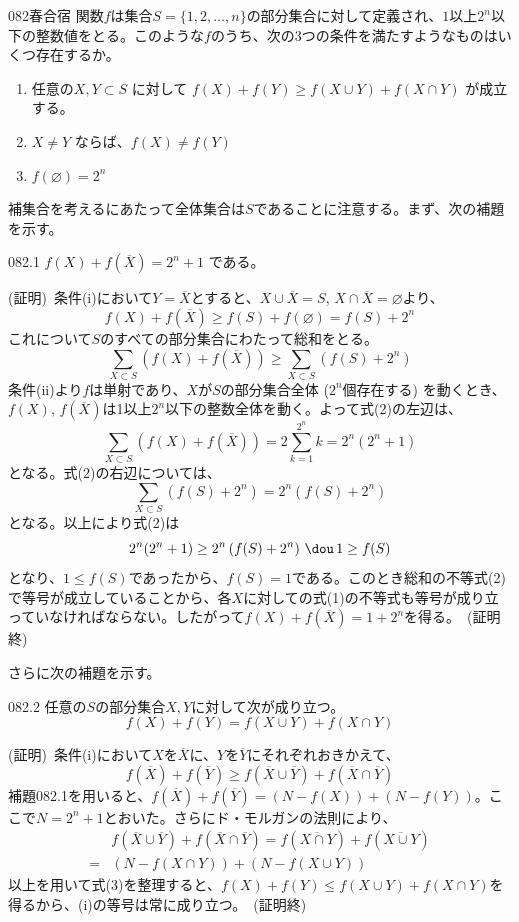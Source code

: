 \begin{prob}{082}{}{春合宿}
 関数$f$は集合$S=\{1, 2, \dots, n\}$の部分集合に対して定義され、$1$以上$2^n$以下の整数値をとる。このような$f$のうち、次の3つの条件を満たすようなものはいくつ存在するか。
 \begin{enumerate}
  \renewcommand{\labelenumi}{\arabic{enumi}.}
  \item 任意の$X, Y \subset S$ に対して $f(X)+f(Y) \ge f(X\cup Y)+f(X\cap Y)$ が成立する。
  \item $X \neq Y$ ならば、$f(X)\neq f(Y)$
  \item $f(\varnothing)=2^n$
 \end{enumerate}
\end{prob}

補集合を考えるにあたって全体集合は$S$であることに注意する。まず、次の補題を示す。
\begin{subthm}{082.1}
 $f(X)+f(\overline{X})=2^n+1$ である。
\end{subthm}

(証明)~条件(i)において$Y=\overline{X}$とすると、$X\cup\overline{X}=S$, $X\cap\overline{X}=\varnothing$より、
\[ f(X)+f(\overline{X})\ge f(S)+f(\varnothing)=f(S)+2^n \tag{1} \]
これについて$S$のすべての部分集合にわたって総和をとる。
\[ \sum_{X\subset S}\left(f(X)+f(\overline{X})\right)\ge\sum_{X\subset S} \left(f(S)+2^n\right) \tag{2} \]
条件(ii)より$f$は単射であり、$X$が$S$の部分集合全体 ($2^n$個存在する) を動くとき、$f(X)$, $f(\overline{X})$は1以上$2^n$以下の整数全体を動く。よって式(2)の左辺は、
\[ \sum_{X\subset S}\left(f(X)+f(\overline{X})\right)=2\sum_{k=1}^{2^n}k = 2^n(2^n+1) \]
となる。式(2)の右辺については、
\[ \sum_{X\subset S}\left(f(S)+2^n\right) = 2^n\left(f(S)+2^n\right) \]
となる。以上により式(2)は
\[ 2^n(2^n+1) \ge 2^n\left(f(S)+2^n \right) \,\dou\, 1\ge f(S) \]
となり、$1\le f(S)$であったから、$f(S)=1$である。このとき総和の不等式(2)で等号が成立していることから、各$X$に対しての式(1)の不等式も等号が成り立っていなければならない。したがって$f(X)+f(\overline{X})=1+2^n$を得る。~(証明終)

さらに次の補題を示す。
\begin{subthm}{082.2}
 任意の$S$の部分集合$X, Y$に対して次が成り立つ。
 \[ f(X)+f(Y)=f(X\cup Y)+f(X\cap Y)  \]
\end{subthm}
(証明)~条件(i)において$X$を$\overline{X}$に、$Y$を$\overline{Y}$にそれぞれおきかえて、
\[ f(\overline{X})+f(\overline{Y})\ge f(\overline{X}\cup\overline{Y})+f(\overline{X}\cap\overline{Y}) \tag{3} \]
補題082.1を用いると、$f(\overline{X})+f(\overline{Y})=(N-f(X))+(N-f(Y))$。ここで$N=2^n+1$とおいた。さらにド・モルガンの法則により、
\begin{align*}
 &f(\overline{X}\cup\overline{Y})+f(\overline{X}\cap\overline{Y})=f(\overline{X\cap Y})+f(\overline{X\cup Y}) \\
 =&(N-f(X\cap Y))+(N-f(X\cup Y))
\end{align*}
以上を用いて式(3)を整理すると、$f(X)+f(Y)\le f(X\cup Y)+f(X\cap Y)$を得るから、(i)の等号は常に成り立つ。~(証明終)

